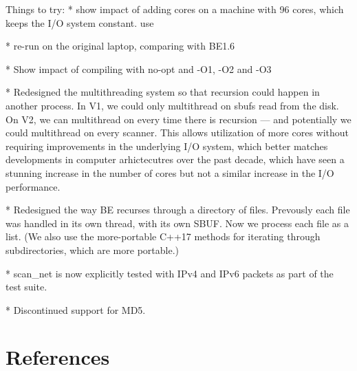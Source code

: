 \documentclass[5p]{elsarticle}
\begin{document}
Things to try:
* show impact of adding cores on a machine with 96 cores, which keeps
the I/O system constant.  use

* re-run on the original laptop, comparing with BE1.6

* Show impact of compiling with no-opt and -O1, -O2 and -O3

* Redesigned the multithreading system so that recursion could happen
in another process. In V1, we could only multithread on sbufs read
from the disk. On V2, we can multithread on every time there is
recursion --- and potentially we could multithread on every
scanner. This allows utilization of more cores without requiring
improvements in the underlying I/O system, which better matches
developments in computer arhictecutres over the past decade, which
have seen a stunning increase in the number of cores but not a similar
increase in the I/O performance.

* Redesigned the way BE recurses through a directory of
files. Prevously each file was handled in its own thread, with its own
SBUF. Now we process each file as a list. (We also use the
more-portable C++17 methods for iterating through subdirectories,
which are more portable.)

* scan_net is now explicitly tested with IPv4 and IPv6 packets as part
of the test suite.

* Discontinued support for MD5.



\section*{References}


\end{document}
